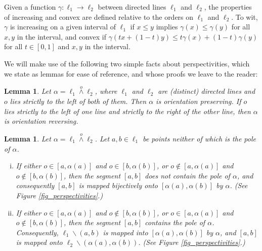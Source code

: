 \documentclass[11pt]{amsart}
\newtheorem{lemma}[theorem]{Lemma}
\theoremstyle{remark}
\numberwithin{equation}{section}
\renewcommand{\leq}{\leqslant}
\begin{document}
Given a function $\gamma\colon \ell_1\to \ell_2$ between directed lines $\ell_1$ and $\ell_2$, the properties of increasing and convex are defined relative to the orders on $\ell_1$ and $\ell_2$. To wit, $\gamma$ is increasing on a given interval of $\ell_1$ if $x\leq y$ implies $\gamma(x)\leq \gamma(y)$ for all $x,y$ in the interval, and convex if $\gamma(tx+(1-t)y)\leq t\gamma(x)+(1-t)\gamma(y)$ 
for all $t\in [0,1]$ and $x,y$ in the interval. 


We will make use of the following two simple facts about perspectivities, which we state as  lemmas for ease of reference, and whose proofs we leave  to the reader:

\begin{lemma}\label{aboutperspectivities}
Let $\alpha=\ell_1\stackrel{o}{\wedge}\ell_2$, where $\ell_1$ and $\ell_2$ are (distinct) directed lines and $o$ lies strictly to the left of both of them. Then $\alpha$ is orientation preserving. If $o$ lies strictly to the left of one line and strictly to the right of the other line, then $\alpha$ is orientation reversing.
\end{lemma}

\begin{lemma}\label{pocketperspectivities}
Let $\alpha=\ell_1\stackrel{o}{\wedge}\ell_2$. Let $a,b\in \ell_1$ be points neither of which is the pole of $\alpha$. 

\begin{enumerate}[(i)]
\item 
If either $o\in [a,\alpha(a)]$ and $o\in [b,\alpha(b)]$, or $o\notin [a,\alpha(a)]$ and $o\notin [b,\alpha(b)]$, then the segment
$[a,b]$ does not contain the pole of $\alpha$, and consequently $[a,b]$ is mapped bijectively onto $[\alpha(a),\alpha(b)]$ by $\alpha$.
(See Figure \ref{fig_perspectivities}.)


\item
If either $o\in [a,\alpha(a)]$ and $o\notin [b,\alpha(b)]$, or $o\in [a,\alpha(a)]$ and $o\notin [b,\alpha(b)]$, then the segment
$[a,b]$  contains the pole of $\alpha$. Consequently, $\ell_1\backslash (a,b)$ is mapped into $[\alpha(a),\alpha(b)]$ by $\alpha$,
and $[a,b]$ is mapped onto $\ell_2\backslash (\alpha(a),\alpha(b))$.
(See Figure \ref{fig_perspectivities}.)
\end{enumerate}
\end{lemma}
\end{document}
